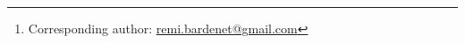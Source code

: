 \author{
R\'emi Bardenet$^{1}$\footnote{Corresponding author: \href{mailto:remi.bardenet@gmail.com}{remi.bardenet@gmail.com}}, Julien Flamant$^1$, Pierre Chainais$^1$\\
\small $^1$ Univ. Lille, CNRS, Centrale Lille, UMR 9189 -— CRIStAL, 59651 Villeneuve d'Ascq, France \\
}
